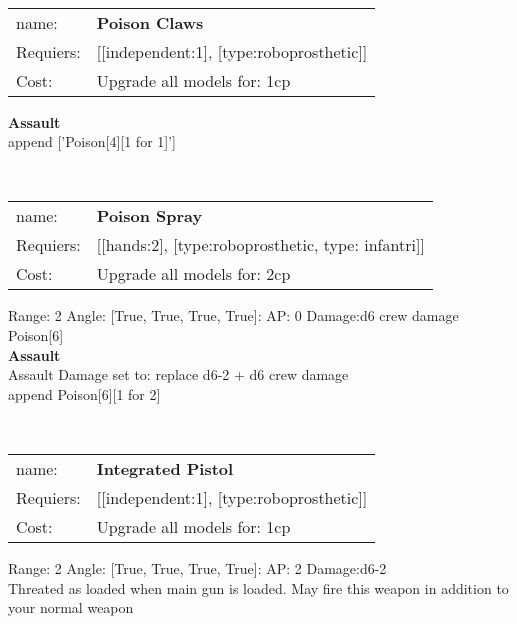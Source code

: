 \ \\
\begin{tabular}{ll}
name: & {\bf Poison Claws } \\
Requiers: & [[independent:1], [type:roboprosthetic]] \\
Cost: & Upgrade all models for: 1cp \\
\end{tabular}





{\bf Assault} \ \\

append ['Poison[4][1 for 1]']


\ \\
\begin{tabular}{ll}
name: & {\bf Poison Spray } \\
Requiers: & [[hands:2], [type:roboprosthetic, type: infantri]] \\
Cost: & Upgrade all models for: 2cp \\
\end{tabular}



Range: 2  Angle: [True, True, True, True]: AP: 0 Damage:d6 crew damage \\
Poison[6]\\ 



{\bf Assault} \ \\
Assault Damage set to: replace d6-2 + d6 crew damage
\\ 

append Poison[6][1 for 2]


\ \\
\begin{tabular}{ll}
name: & {\bf Integrated Pistol } \\
Requiers: & [[independent:1], [type:roboprosthetic]] \\
Cost: & Upgrade all models for: 1cp \\
\end{tabular}



Range: 2  Angle: [True, True, True, True]: AP: 2 Damage:d6-2 \\
Threated as loaded when main gun is loaded. May fire this weapon in addition to your normal weapon\\ 








